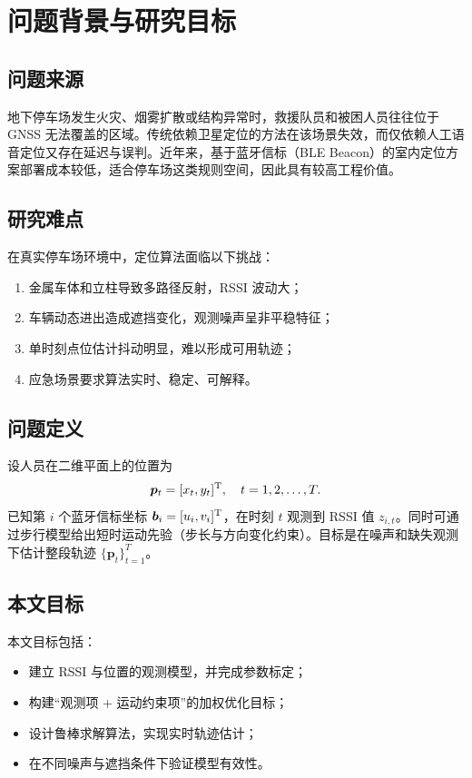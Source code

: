 \chapter{问题背景与研究目标}

\section{问题来源}
地下停车场发生火灾、烟雾扩散或结构异常时，救援队员和被困人员往往位于 GNSS 无法覆盖的区域。传统依赖卫星定位的方法在该场景失效，而仅依赖人工语音定位又存在延迟与误判。近年来，基于蓝牙信标（BLE Beacon）的室内定位方案部署成本较低，适合停车场这类规则空间，因此具有较高工程价值。

\section{研究难点}
在真实停车场环境中，定位算法面临以下挑战：
\begin{enumerate}
  \item 金属车体和立柱导致多路径反射，RSSI 波动大；
  \item 车辆动态进出造成遮挡变化，观测噪声呈非平稳特征；
  \item 单时刻点位估计抖动明显，难以形成可用轨迹；
  \item 应急场景要求算法实时、稳定、可解释。
\end{enumerate}

\section{问题定义}
设人员在二维平面上的位置为
\[
\bm p_t=[x_t,y_t]^{\mathrm{T}},\quad t=1,2,\dots,T.
\]
已知第 $i$ 个蓝牙信标坐标 $\bm b_i=[u_i,v_i]^{\mathrm{T}}$，在时刻 $t$ 观测到 RSSI 值 $z_{i,t}$。同时可通过步行模型给出短时运动先验（步长与方向变化约束）。目标是在噪声和缺失观测下估计整段轨迹 $\{\bm p_t\}_{t=1}^T$。

\section{本文目标}
本文目标包括：
\begin{itemize}
  \item 建立 RSSI 与位置的观测模型，并完成参数标定；
  \item 构建“观测项 + 运动约束项”的加权优化目标；
  \item 设计鲁棒求解算法，实现实时轨迹估计；
  \item 在不同噪声与遮挡条件下验证模型有效性。
\end{itemize}

